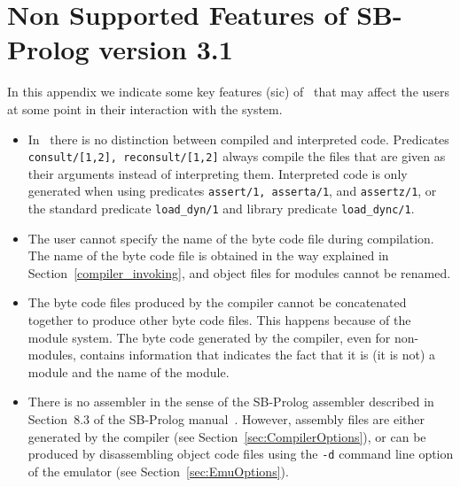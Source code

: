 \chapter{Non Supported Features of SB-Prolog version 3.1}

In this appendix we indicate some key features (sic) of \ourprolog\
that may affect the users at some point in their interaction with 
the system.  

\begin{itemize} 
\item	In \ourprolog\, there is no distinction between compiled and 
	interpreted code.  Predicates {\tt consult/[1,2], reconsult/[1,2]} 
	always compile the files that are given as their arguments instead 
	of interpreting them.  Interpreted code is only generated when
	using predicates {\tt assert/1, asserta/1}, and {\tt assertz/1}, or
	the standard predicate {\tt load\_dyn/1} and library predicate
	{\tt load\_dync/1}.
\item	The user cannot specify the name of the byte code file during 
	compilation.  The name of the byte code file is obtained in the way 
	explained in Section~\ref{compiler_invoking}, and object files for
	modules cannot be renamed.
\item	The byte code files produced by the compiler cannot be concatenated 
	together to produce other byte code files.  This happens because
	of the module system.  The byte code generated by the compiler,
	even for non-modules, contains information that indicates the fact
	that it is (it is not) a module and the name of the module.
\item	There is no assembler in the sense of the SB-Prolog assembler 
	described in Section~8.3 of the SB-Prolog manual~\cite{sbprolog}.
	However, assembly files are either generated by the compiler 
	(see Section~\ref{sec:CompilerOptions}), or can be produced by 
	disassembling object code files using the {\tt -d} command line
	option of the emulator (see Section~\ref{sec:EmuOptions}).
\end{itemize}
